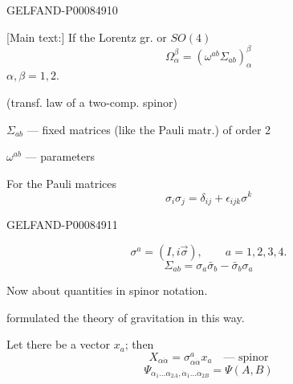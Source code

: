 \begin{GelfandAdjacentEvidence}{GELFAND-P000849}{10}


[Main text:] If the Lorentz gr. or \(SO(4)\)
\[
\Omega_\alpha^\beta=(\omega^{ab}\Sigma_{ab})_\alpha^\beta \tag{2}
\]
\(\alpha,\beta=1,2.\)

(transf. law of a two-comp. spinor)

\(\Sigma_{ab}\) — fixed matrices (like the Pauli matr.) of order 2

\(\omega^{ab}\) — parameters

For the Pauli matrices
\[
\sigma_i\sigma_j=\delta_{ij}+\epsilon_{ijk}\sigma^k \tag{3}
\]
\end{GelfandAdjacentEvidence}
\begin{GelfandAdjacentEvidence}{GELFAND-P000849}{11}

\[
\sigma^a=(I,i\vec\sigma),\qquad a=1,2,3,4.
\]
\[
\Sigma_{ab}=\sigma_a\bar\sigma_b-\bar\sigma_b\sigma_a \tag{4}
\]

Now about quantities in spinor notation.

 formulated the theory of gravitation in this way.

Let there be a vector \(x_a\); then
\[
X_{\alpha\dot\alpha}=\sigma^a_{\alpha\dot\alpha}x_a\quad\text{— spinor} \tag{5}
\]
\[
\Psi_{\alpha_1\ldots\alpha_{2A},\dot\alpha_1\ldots\dot\alpha_{2B}}=\Psi(A,B) \tag{6}
\]
\end{GelfandAdjacentEvidence}



